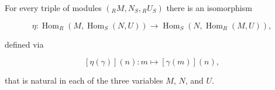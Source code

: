 For every triple of modules $({}_R M, N_S, {}_R U_S)$ there is an isomorphism

$$\eta: \operatorname{Hom}_R(M, \operatorname{Hom}_S(N, U)) \to \operatorname{Hom}_S(N, \operatorname{Hom}_R(M, U)),$$

defined via

$$[\eta(\gamma)](n): m \mapsto [\gamma(m)](n),$$

that is natural in each of the three variables $M$, $N$, and $U$.
